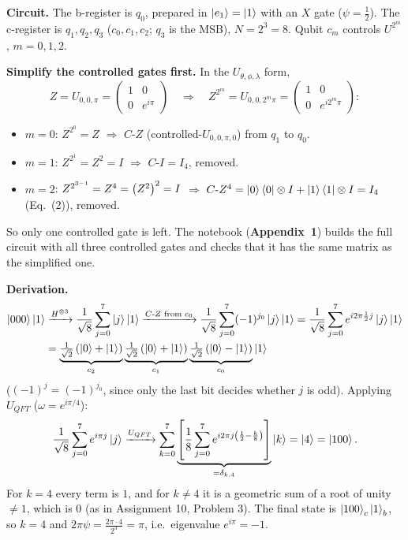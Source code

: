 \documentclass[a4paper, 10pt]{article}
\begin{document}
\begin{solution}
	\noindent \textbf{Circuit.} The b-register is \( q_0 \), prepared in \( \ket{e_1} = \ket{1} \) with an \( X \) gate (\( \psi = \frac{1}{2} \)). The c-register is \( q_1, q_2, q_3 \) (\( c_0, c_1, c_2 \); \( q_3 \) is the MSB), \( N = 2^3 = 8 \). Qubit \( c_m \) controls \( U^{2^m} \), \( m = 0, 1, 2 \).

	\myspace

	\noindent \textbf{Simplify the controlled gates first.} In the \( U_{\theta, \phi, \lambda} \) form,
	\[
		Z = U_{0, 0, \pi} = \begin{pmatrix} 1 & 0 \\ 0 & e^{i\pi} \end{pmatrix}
		\quad\Rightarrow\quad
		Z^{2^m} = U_{0, 0, 2^m\pi} = \begin{pmatrix} 1 & 0 \\ 0 & e^{i2^m\pi} \end{pmatrix}:
	\]
	\begin{itemize}
		\item \( m = 0 \): \( Z^{2^0} = Z \) \( \Rightarrow \) \( C\text{-}Z \) (controlled-\( U_{0, 0, \pi, 0} \)) from \( q_1 \) to \( q_0 \).
		\item \( m = 1 \): \( Z^{2^1} = Z^2 = I \) \( \Rightarrow \) \( C\text{-}I = I_4 \), removed.
		\item \( m = 2 \): \( Z^{2^{3 - 1}} = Z^4 = \left(Z^2\right)^2 = I \) \( \Rightarrow \) \( C\text{-}Z^4 = \ket{0}\bra{0} \otimes I + \ket{1}\bra{1} \otimes I = I_4 \) (Eq.~(2)), removed.
	\end{itemize}
	So only one controlled gate is left. The notebook (\textbf{Appendix~1}) builds the full circuit with all three controlled gates and checks that it has the same matrix as the simplified one.

	\noindent \textbf{Derivation.}
	\begin{align*}
		\ket{000}\ket{1} & \xrightarrow{H^{\otimes 3}} \frac{1}{\sqrt{8}}\sum_{j = 0}^{7}\ket{j}\ket{1}
		\xrightarrow{C\text{-}Z \text{ from } c_0} \frac{1}{\sqrt{8}}\sum_{j = 0}^{7}(-1)^{j_0}\ket{j}\ket{1} = \frac{1}{\sqrt{8}}\sum_{j = 0}^{7}e^{i2\pi\frac{1}{2}j}\ket{j}\ket{1} \\
		                 & = \underbrace{\tfrac{1}{\sqrt{2}}\left(\ket{0} + \ket{1}\right)}_{c_2}\underbrace{\tfrac{1}{\sqrt{2}}\left(\ket{0} + \ket{1}\right)}_{c_1}\underbrace{\tfrac{1}{\sqrt{2}}\left(\ket{0} - \ket{1}\right)}_{c_0}\ket{1}
	\end{align*}
	(\( (-1)^j = (-1)^{j_0} \), since only the last bit decides whether \( j \) is odd). Applying \( U_{QFT} \) (\( \omega = e^{i\pi/4} \)):
	\[
		\frac{1}{\sqrt{8}}\sum_{j = 0}^{7}e^{i\pi j}\ket{j} \xrightarrow{U_{QFT}} \sum_{k = 0}^{7}\underbrace{\left[\frac{1}{8}\sum_{j = 0}^{7}e^{i2\pi j\left(\frac{1}{2} - \frac{k}{8}\right)}\right]}_{= \delta_{k, 4}}\ket{k} = \ket{4} = \ket{100}.
	\]
	For \( k = 4 \) every term is \( 1 \), and for \( k \neq 4 \) it is a geometric sum of a root of unity \( \neq 1 \), which is \( 0 \) (as in Assignment 10, Problem 3).
	The final state is \( \ket{100}_c\ket{1}_b \), so \( k = 4 \) and \( 2\pi\psi = \frac{2\pi \cdot 4}{2^3} = \pi \), i.e.\ eigenvalue \( e^{i\pi} = -1 \). \checkmark


\end{solution}
\end{document}
